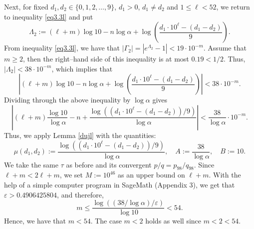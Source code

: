 Next, for fixed \( d_1, d_2 \in \{0, 1, 2, \ldots, 9\} \), \( d_1 > 0 \), \(d_1 \neq d_2\) and \( 1 \leq \ell < 52 \), we return to inequality \eqref{eq3.3l} and put
\[
\Lambda_2 := (\ell + m) \log 10 - n \log \alpha + \log \left( \frac{d_1 \cdot 10^\ell - (d_1 - d_2)}{9} \right).
\]
From inequality \eqref{eq3.3l}, we have that
\(
|\Gamma_2| = |e^{\Lambda_2} - 1| < 19\cdot10^{-m}.
\)
Assume that \( m \geq 2 \), then the right--hand side of this inequality is at most \( 0.19 < 1/2 \). Thus,
$|\Lambda_2| < 38\cdot10^{-m}$,
which implies that
\[
\left| (\ell + m) \log 10 - n \log \alpha + \log \left( \frac{d_1 \cdot 10^\ell - (d_1 - d_2)}{9} \right) \right| < 38\cdot10^{-m}.
\]
Dividing through the above inequality by \( \log \alpha \) gives
\[
\left| (\ell + m) \frac{\log 10}{\log \alpha} - n + \frac{\log ((d_1 \cdot 10^\ell - (d_1 - d_2))/9)}{\log \alpha} \right| < \frac{38}{ \log \alpha}\cdot 10^{-m}.
\]
Thus, we apply Lemma \ref{dujl} with the quantities:
\[
\mu(d_1, d_2) := \frac{\log ((d_1 \cdot 10^\ell - (d_1 - d_2))/9)}{\log \alpha}, \quad A := \frac{38}{\log \alpha}, \quad B := 10.
\]
We take the same \( \tau \) as before and its convergent \( p/q = p_{98}/q_{98} \). Since \( \ell + m < 2\ell + m \), we set \( M := 10^{46} \) as an upper bound on \( \ell + m \). With the help of a simple computer program in SageMath (Appendix 3), we get that \( \varepsilon > 0.4906425804 \), and therefore,
\[
m \leq \frac{\log((38/\log \alpha)/\varepsilon)}{\log 10} < 54.
\]
Hence, we have that \( m < 54 \). The case \( m < 2 \) holds as well since \( m < 2 < 54 \).

